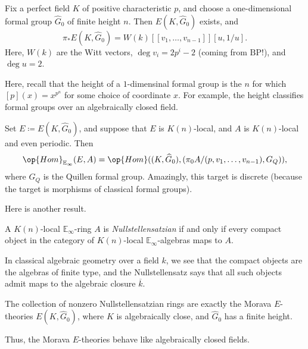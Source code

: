 \documentclass[../notes.tex]{subfiles}
\begin{document}
\begin{theorem}
	Fix a perfect field $K$ of positive characteristic $p$, and choose a one-dimensional formal group $\widehat{ G}_0$ of finite height $n$. Then $E(K,\widehat G_0)$ exists, and
	\[\pi_*E(K,\widehat G_0)=W(k)[[v_1,\ldots,v_{n-1}]][u,1/u].\]
	Here, $W(k)$ are the Witt vectors, $\deg v_i=2p^i-2$ (coming from $\mathrm{BP}$!), and $\deg u=2$.
\end{theorem}
Here, recall that the height of a $1$-dimensinal formal group is the $n$ for which $[p](x)=x^{p^n}$ for some choice of coordinate $x$. For example, the height classifies formal groups over an algebraically closed field.
\begin{remark}
	Set $E\coloneqq E(K,\widehat G_0)$, and suppose that $E$ is $K(n)$-local, and $A$ is $K(n)$-local and even periodic. Then
	\[\op{Hom}_{\mathbb E_\infty}(E,A)=\op{Hom}((K,\widehat G_0),(\pi_0A/(p,v_1,\ldots,v_{n-1}),G_Q)),\]
	where $G_Q$ is the Quillen formal group. Amazingly, this target is discrete (because the target is morphisms of classical formal groups).
\end{remark}
Here is another result.
\begin{definition}[Nullstellensatzian]
	A $K(n)$-local $\mathbb E_\infty$-ring $A$ is \textit{Nullstellensatzian} if and only if every compact object in the category of $K(n)$-local $\mathbb E_\infty$-algebras maps to $A$.
\end{definition}
\begin{remark}
	In classical algebraic geometry over a field $k$, we see that the compact objects are the algebras of finite type, and the Nullstellensatz says that all such objects admit maps to the algebraic closure $\overline k$.
\end{remark}
\begin{theorem}
	The collection of nonzero Nullstellensatzian rings are exactly the Morava $E$-theories $E(K,\widehat G_0)$, where $K$ is algebraically close, and $\widehat G_0$ has a finite height.
\end{theorem}
Thus, the Morava $E$-theories behave like algebraically closed fields.
\end{document}
